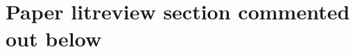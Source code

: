 \documentclass[12pt]{llncs}
\newcommand{\dzN}[1]{\todo[inline, size=\small, color=yellow!30]{[dz] #1}}
\begin{document}
 \section{Paper litreview section commented out below}
\begin{comment}

\section{Related Work}
\label{sec:Context}
%
The use of artificial neural networks in acoustic detection and classification of species dates back to at least the beginning of the century, with the first approaches addressing the identification of bat echolocation calls \cite{parsons2000}. Both manual and algorithmic techniques have subsequently been used to identify insects \cite{chesmore2004automated,zilli2014hidden}, elephants \cite{clemins2002automatic}, delphinids \cite{oswald2003}, and other animals. The benefits of leveraging the sound animals produce -- both actively as communication mechanisms and passively as a results of their movement -- is clear: animals themselves use sound to identify prey, predators, and mates. Sound can therefore be used to locate individuals for biodiversity monitoring, pest control, identification of endangered species and more.

This section will therefore review the use of machine learning approaches in bioacoustics, in particular with respect to insect recognition. We describe the traditional feature and classification approaches to acoustic signal detection. In contrast, we also present the benefit of feature extraction methods inherent to current deep learning approaches. Finally, we narrow our focus down to the often overlooked wavelet transform, which offers significant performance gains in our pipeline.



\end{comment}
\end{document}
